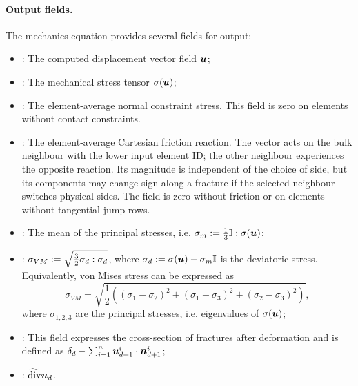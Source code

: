 \paragraph{Output fields.}
The mechanics equation provides several fields for output:
\begin{itemize}
    \item {}: The computed displacement vector field $\mathbf{\boldsymbol{u}}$;
    \item {}: The mechanical stress tensor ${\mathbb{\sigma}}(\mathbf{\boldsymbol{u}})$;
    \item {}: The element-average normal constraint stress.
    This field is zero on elements without contact constraints.
    \item {}:
    The element-average Cartesian friction reaction.
    The vector acts on the bulk neighbour with the lower input element ID; the other neighbour experiences the opposite reaction. Its magnitude is independent of the choice of side, but its components may change sign along a fracture if the selected neighbour switches physical sides.
    The field is zero without friction or on elements without tangential jump rows.
    \item {}: The mean of the principal stresses, i.e. $\sigma_m:=\frac13{\mathbb{I}}:{\mathbb{\sigma}}(\mathbf{\boldsymbol{u}})$;
    \item {}: $\sigma_{VM}:=\sqrt{\frac32{\mathbb{\sigma}}_d:{\mathbb{\sigma}}_d}$, where ${\mathbb{\sigma}}_d:={\mathbb{\sigma}}(\mathbf{\boldsymbol{u}})-\sigma_m{\mathbb{I}}$ is the deviatoric stress.
    Equivalently, von Mises stress can be expressed as
    \[ \sigma_{VM} = \sqrt{\frac12\left((\sigma_1-\sigma_2)^2+(\sigma_1-\sigma_3)^2+(\sigma_2-\sigma_3)^2\right)}, \]
    where $\sigma_{1,2,3}$ are the principal stresses, i.e. eigenvalues of ${\mathbb{\sigma}}(\mathbf{\boldsymbol{u}})$;
    \item {}: This field expresses the cross-section of fractures after deformation and is defined as $\delta_d-\sum_{i=1}^n\mathbf{\boldsymbol{u}}^i_{d+1}\cdot\mathbf{\boldsymbol{n}}^i_{d+1}$;
    \item {}: $\widetilde{\operatorname{div}}\mathbf{\boldsymbol{u}}_d$.
\end{itemize}

